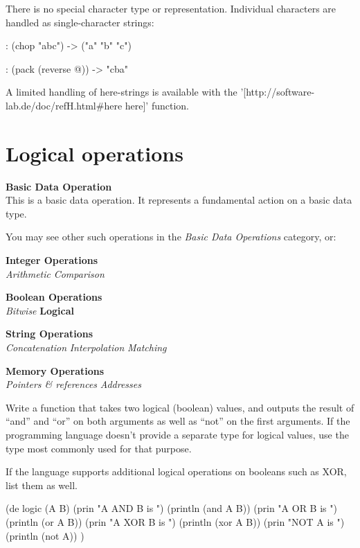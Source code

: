 \begin{itemize}
\begin{wideverbatim}
There is no special character type or representation. Individual characters are
handled as single-character strings:

: (chop "abc")
-> ("a" "b" "c")

: (pack (reverse @))
-> "cba"

A limited handling of here-strings is available with the
'[http://software-lab.de/doc/refH.html#here here]' function.

\end{wideverbatim}

\pagebreak{}
\section*{Logical operations}

\textbf{Basic Data Operation}\\ This is a basic data operation. It
represents a fundamental action on a basic data type.

You may see other such operations in the \emph{Basic Data Operations}
category, or:

\textbf{Integer Operations} \\
\emph{Arithmetic} \textbar{} \emph{Comparison}

\textbf{Boolean Operations} \\ \emph{Bitwise} \textbar{}
\textbf{Logical}

\textbf{String Operations} \\
\emph{Concatenation} \textbar{} \emph{Interpolation} \textbar{}
\emph{Matching}

\textbf{Memory Operations} \\
\emph{Pointers \& references} \textbar{} \emph{Addresses}

Write a function that takes two logical (boolean) values, and outputs
the result of ``and'' and ``or'' on both arguments as well as ``not'' on
the first arguments. If the programming language doesn't provide a
separate type for logical values, use the type most commonly used for
that purpose.

If the language supports additional logical operations on booleans such
as XOR, list them as well.

\begin{wideverbatim}

(de logic (A B)
   (prin "A AND B is ")
   (println (and A B))
   (prin "A OR B is ")
   (println (or A B))
   (prin "A XOR B is ")
   (println (xor A B))
   (prin "NOT A is ")
   (println (not A)) )


\end{wideverbatim}
\end{itemize}
